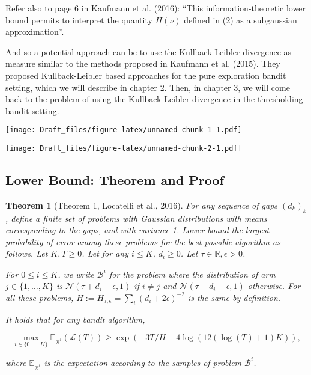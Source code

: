 \documentclass[12pt,]{article}
\newtheorem{theorem}{Theorem}
\begin{document}
Refer also to page 6 in Kaufmann et al. (2016): ``This
information-theoretic lower bound permits to interpret the quantity
\(H(\nu)\) defined in (2) as a subgaussian approximation''.

And so a potential approach can be to use the Kullback-Leibler
divergence as measure similar to the methods proposed in Kaufmann et al.
(2015). They proposed Kullback-Leibler based approaches for the pure
exploration bandit setting, which we will describe in chapter 2. Then,
in chapter 3, we will come back to the problem of using the
Kullback-Leibler divergence in the thresholding bandit setting.

\texttt{[image: Draft\_files/figure-latex/unnamed-chunk-1-1.pdf]}

\texttt{[image: Draft\_files/figure-latex/unnamed-chunk-2-1.pdf]}

\subsection{Lower Bound: Theorem and
Proof}\label{lower-bound-theorem-and-proof}

\begin{theorem}[Theorem 1, Locatelli et al., 2016] 
\label{theorem:Locatelli2016Theorem1}
For any sequence of gaps $(d_k)_k$, define a finite set of problems with Gaussian distributions with means corresponding to the gaps, and with variance 1. Lower bound the largest probability of error among these problems for the best possible algorithm as follows. Let $K,T \geq 0$. Let for any $i \leq K$, $d_i \geq 0$. Let $\tau \in \mathbb{R}, \epsilon > 0$.

For $0 \leq i \leq K$, we write $\mathcal{B}^i$ for the problem where the distribution of arm $j \in \{1, \dots, K\}$ is $\mathcal{N}(\tau+d_i+\epsilon, 1)$ if $i \neq j$ and $\mathcal{N}(\tau-d_i-\epsilon, 1)$ otherwise. For all these problems, $H := H_{\tau, \epsilon} = \sum_i (d_i+2\epsilon)^{-2}$ is the same by definition.

It holds that for any bandit algorithm,

\begin{equation*}
\max_{i \in \{0, \dots, K\}} \mathbb{E}_{\mathcal{B}^i} (\mathcal{L}(T)) \geq \exp(-3T/H-4 \log(12(\log(T)+1)K)),
\end{equation*}

where $\mathbb{E}_{\mathcal{B}^i}$ is the expectation according to the samples of problem $\mathcal{B}^i$.
\end{theorem}
\end{document}
